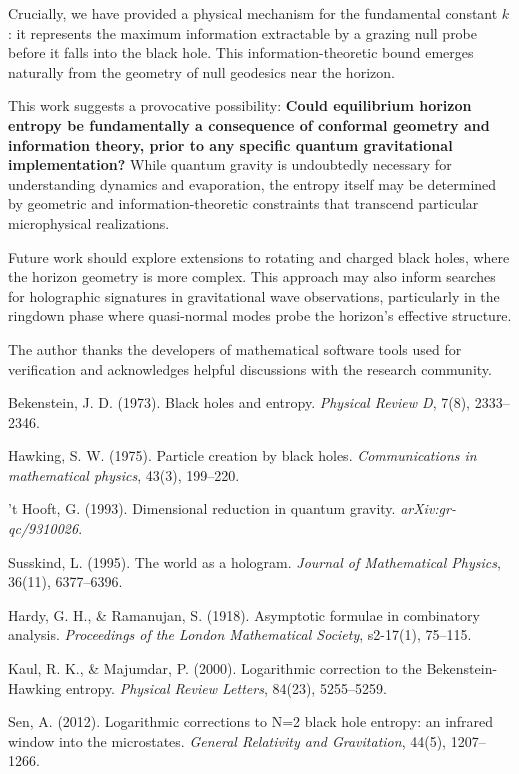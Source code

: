 \documentclass[12pt, letterpaper]{article}
\begin{document}
Crucially, we have provided a physical mechanism for the fundamental constant $k$: it represents the maximum information extractable by a grazing null probe before it falls into the black hole. This information-theoretic bound emerges naturally from the geometry of null geodesics near the horizon.

This work suggests a provocative possibility: \textbf{Could equilibrium horizon entropy be fundamentally a consequence of conformal geometry and information theory, prior to any specific quantum gravitational implementation?} While quantum gravity is undoubtedly necessary for understanding dynamics and evaporation, the entropy itself may be determined by geometric and information-theoretic constraints that transcend particular microphysical realizations.

Future work should explore extensions to rotating and charged black holes, where the horizon geometry is more complex. This approach may also inform searches for holographic signatures in gravitational wave observations, particularly in the ringdown phase where quasi-normal modes probe the horizon's effective structure.

\begin{acknowledgments}
The author thanks the developers of mathematical software tools used for verification and acknowledges helpful discussions with the research community.
\end{acknowledgments}


\begin{thebibliography}{9}

Bekenstein, J. D. (1973). Black holes and entropy. \textit{Physical Review D}, 7(8), 2333–2346.

Hawking, S. W. (1975). Particle creation by black holes. \textit{Communications in mathematical physics}, 43(3), 199–220.

't Hooft, G. (1993). Dimensional reduction in quantum gravity. \textit{arXiv:gr-qc/9310026}.

Susskind, L. (1995). The world as a hologram. \textit{Journal of Mathematical Physics}, 36(11), 6377–6396.

Hardy, G. H., \& Ramanujan, S. (1918). Asymptotic formulae in combinatory analysis. \textit{Proceedings of the London Mathematical Society}, s2-17(1), 75–115.

Kaul, R. K., \& Majumdar, P. (2000). Logarithmic correction to the Bekenstein-Hawking entropy. \textit{Physical Review Letters}, 84(23), 5255–5259.

Sen, A. (2012). Logarithmic corrections to N=2 black hole entropy: an infrared window into the microstates. \textit{General Relativity and Gravitation}, 44(5), 1207–1266.

\end{thebibliography}
\end{document}
